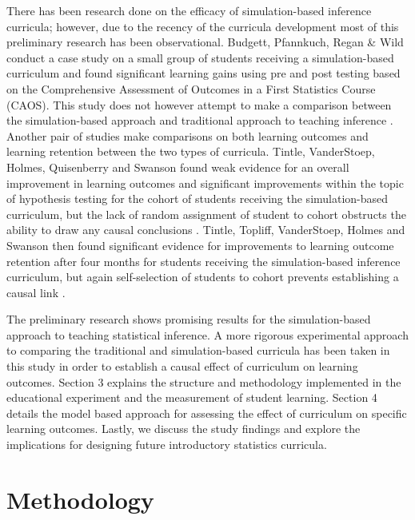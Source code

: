 \documentclass[11pt]{isuthesis}\usepackage[]{graphicx}\usepackage[]{color}
\begin{document}
There has been research done on the efficacy of simulation-based inference curricula; however, due to the recency of the curricula development most of this preliminary research has been observational.  Budgett, Pfannkuch, Regan \& Wild conduct a case study on a small group of students receiving a simulation-based curriculum and found significant learning gains using pre and post testing based on the Comprehensive Assessment of Outcomes in a First Statistics Course (CAOS).  This study does not however attempt to make a comparison between the simulation-based approach and traditional approach to teaching inference \citep{Budgett2013}. Another pair of studies make comparisons on both learning outcomes and learning retention between the two types of curricula. Tintle, VanderStoep, Holmes, Quisenberry and Swanson found weak evidence for an overall improvement in learning outcomes and significant improvements within the topic of hypothesis testing for the cohort of students receiving the simulation-based curriculum, but the lack of random assignment of student to cohort obstructs the ability to draw any causal conclusions \citep{Tintle2011}.  Tintle, Topliff, VanderStoep, Holmes and Swanson then found significant evidence for improvements to learning outcome retention after four months for students receiving the simulation-based inference curriculum, but again self-selection of students to cohort prevents establishing a causal link \citep{Tintle2012}.  

The preliminary research shows promising results for the simulation-based approach to teaching statistical inference.  A more rigorous experimental approach to comparing the traditional and simulation-based curricula has been taken in this study in order to establish a causal effect of curriculum on learning outcomes. Section 3 explains the structure and methodology implemented in the educational experiment and the measurement of student learning.  Section 4 details the model based approach for assessing the effect of curriculum on specific learning outcomes.  Lastly, we discuss the study findings and explore the implications for designing future introductory statistics curricula.
\section{Methodology}
\label{methods}
\end{document}
